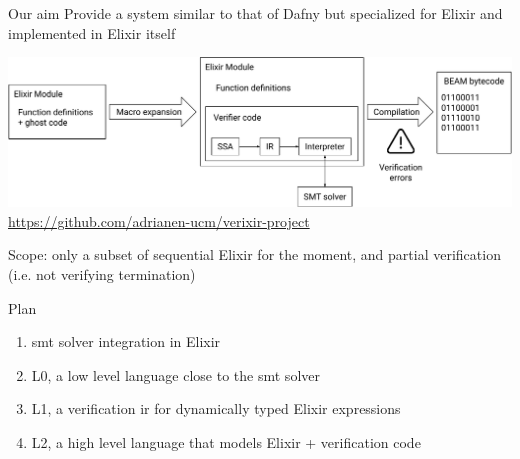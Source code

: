 \documentclass{beamer}
\begin{document}
  \begin{frame}{Our aim}
    Provide a system similar to that of Dafny but specialized for Elixir
    and implemented in Elixir itself

    \pause \bigskip

    \begin{center}
      \includegraphics[width=\textwidth]{Images/Vectorial/Diagram.pdf}
      \url{https://github.com/adrianen-ucm/verixir-project}
    \end{center}
    
    \pause \bigskip

    Scope: only a subset of sequential Elixir for the moment, and partial 
    verification (i.e. not verifying termination)
  \end{frame}
  \begin{frame}{Plan}

    \begin{enumerate}
      \item \pause \acrshort*{smt} solver integration in Elixir
      \item \pause L0, a low level language close to the \acrshort*{smt} solver
      \item \pause L1, a verification \gls*{ir} for dynamically typed Elixir expressions
      \item \pause L2, a high level language that models Elixir + verification code
    \end{enumerate}
  \end{frame}
\end{document}
